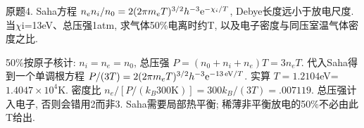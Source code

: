\begin{exercise}\label{ex:03-1-4}
原题4. Saha方程 $n_en_i/n_0=2(2\pi m_eT)^{3/2}h^{-3}\mathrm e^{-\chi_i/T}$, Debye长度远小于放电尺度. 当\ensuremath{\chi}i=13eV、总压强1atm, 求气体50\%电离时约T, 以及电子密度与同压室温气体密度之比.
\end{exercise}
\begin{solution}
50\%按原子核计: $n_i=n_e=n_0$, 总压强 $P=(n_0+n_i+n_e)T=3n_eT$. 代入Saha得到一个单调根方程 $P/(3T)=2(2\pi m_eT)^{3/2}h^{-3}\mathrm e^{-13\,\mathrm{eV}/T}$. 实算 $T=1.2104$eV=$1.4047\times10^4$K. 密度比 $n_e/[P/(k_B300\mathrm K)]=300k_B/(3T)=.007119$. 总压强计入电子, 否则会错用2而非3. Saha需要局部热平衡; 稀薄非平衡放电的50\%不必由此T给出.
\end{solution}
